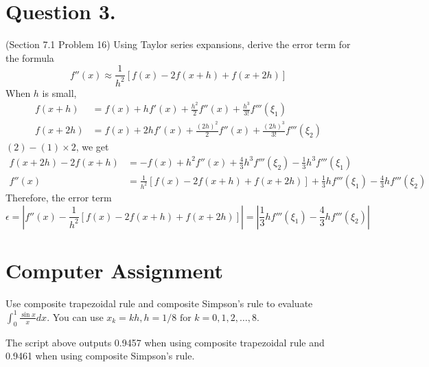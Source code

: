 \documentclass[10pt]{report}
\newcommand{\dintt}[4] {\int_{#1}^{#2} #3 d#4}
\newcommand{\abs}[1] {\left| #1 \right|}
\begin{document}
\section*{Question 3.}
(Section 7.1 Problem 16) Using Taylor series expansions, derive the error term for the formula
\[
f''(x) \approx \frac{1}{h^2}\left[f(x) - 2f(x+h) + f(x+2h)\right]
\]
When $h$ is small,
\begin{align}
	f(x+h) &= f(x) + hf'(x) + \frac{h^2}{2}f''(x) + \frac{h^3}{3!}f'''(\xi_1)\\
	f(x+2h) &= f(x) + 2hf'(x) + \frac{(2h)^2}{2}f''(x) + \frac{(2h)^3}{3!}f'''(\xi_2)
\end{align}
$(2) - (1)\times 2$, we get
\begin{align*}
	f(x + 2h) - 2f(x+h) &= -f(x) + h^2f''(x) + \frac{4}{3}h^3f'''(\xi_2) - \frac{1}{3}h^3f'''(\xi_1)\\
	f''(x) &= \frac{1}{h^2}[f(x) - 2f(x+h) + f(x + 2h)] + \frac{1}{3}hf'''(\xi_1) - \frac{4}{3}hf'''(\xi_2) 
\end{align*}
Therefore, the error term
\[
	\epsilon = \abs{f''(x) - \frac{1}{h^2}[f(x) - 2f(x+h) + f(x + 2h)]} = \abs{\frac{1}{3}hf'''(\xi_1) - \frac{4}{3}hf'''(\xi_2)}
\]

\section*{Computer  Assignment}
Use composite trapezoidal rule and composite Simpson's rule to evaluate $\dintt{0}{1}{\frac{\sin{x}}{x}}{x}$. You can use $x_k = kh, h = 1/8 \text{ for } k = 0,1,2,\dots,8.$

The script above outputs 0.9457 when using composite trapezoidal rule and 0.9461 when using composite Simpson's rule.
\end{document}
